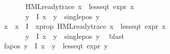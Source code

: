 \begin{isabellebody}
\ \ \ \ \ \ \ {\isacharparenleft}{\kern0pt}HML{\isacharunderscore}{\kern0pt}ready{\isacharunderscore}{\kern0pt}trace\ x\ {\isasymand}\ less{\isacharunderscore}{\kern0pt}eq{\isacharunderscore}{\kern0pt}t\ {\isacharparenleft}{\kern0pt}expr\ x{\isacharparenright}{\kern0pt}\ {\isacharparenleft}{\kern0pt}{\isasyminfinity}{\isacharcomma}{\kern0pt}\ {\isasyminfinity}{\isacharcomma}{\kern0pt}\ {\isasyminfinity}{\isacharcomma}{\kern0pt}\ {}{\isacharcomma}{\kern0pt}\ {}{\isacharcomma}{\kern0pt}\ {}{\isacharparenright}{\kern0pt}{\isacharparenright}{\kern0pt}\ {\isasymand}\isanewline
\ \ \ \ \ \ \ {\isacharparenleft}{\kern0pt}{\isasymforall}y{\isasymin}{\isasymPhi}\ {\isacharbackquote}{\kern0pt}\ I{\isachardot}{\kern0pt}\ x\ {\isasymnoteq}\ y\ {\isasymlongrightarrow}\ single{\isacharunderscore}{\kern0pt}pos\ y{\isacharparenright}{\kern0pt}{\isachardoublequoteclose}\isanewline
\ \ \ \ \isamarkupfalse%
\ \isamarkupfalse%
\ x\ \ {\isachardoublequoteopen}x{\isasymin}{\isasymPhi}\ {\isacharbackquote}{\kern0pt}\ I{\isachardoublequoteclose}\ \ x{\isacharunderscore}{\kern0pt}prop{\isacharcolon}{\kern0pt}\ {\isachardoublequoteopen}{\isacharparenleft}{\kern0pt}HML{\isacharunderscore}{\kern0pt}ready{\isacharunderscore}{\kern0pt}trace\ x\ {\isasymand}\ less{\isacharunderscore}{\kern0pt}eq{\isacharunderscore}{\kern0pt}t\ {\isacharparenleft}{\kern0pt}expr\ x{\isacharparenright}{\kern0pt}\ {\isacharparenleft}{\kern0pt}{\isasyminfinity}{\isacharcomma}{\kern0pt}\ {\isasyminfinity}{\isacharcomma}{\kern0pt}\ {\isasyminfinity}{\isacharcomma}{\kern0pt}\ {}{\isacharcomma}{\kern0pt}\ {}{\isacharcomma}{\kern0pt}\ {}{\isacharparenright}{\kern0pt}{\isacharparenright}{\kern0pt}\ {\isasymand}\isanewline
\ \ \ \ \ \ \ {\isacharparenleft}{\kern0pt}{\isasymforall}y{\isasymin}{\isasymPhi}\ {\isacharbackquote}{\kern0pt}\ I{\isachardot}{\kern0pt}\ x\ {\isasymnoteq}\ y\ {\isasymlongrightarrow}\ single{\isacharunderscore}{\kern0pt}pos\ y{\isacharparenright}{\kern0pt}{\isachardoublequoteclose}\ \isamarkupfalse%
\ blast\isanewline
\ \ \ \ \isamarkupfalse%
\ fa{\isacharunderscore}{\kern0pt}pos{\isacharcolon}{\kern0pt}\ {\isachardoublequoteopen}{\isasymforall}y{\isasymin}{\isasymPhi}\ {\isacharbackquote}{\kern0pt}\ I{\isachardot}{\kern0pt}\ x\ {\isasymnoteq}\ y\ {\isasymlongrightarrow}\ less{\isacharunderscore}{\kern0pt}eq{\isacharunderscore}{\kern0pt}t\ {\isacharparenleft}{\kern0pt}expr\ y{\isacharparenright}{\kern0pt}\ {\isacharparenleft}{\kern0pt}{}{\isacharcomma}{\kern0pt}\ {\isasyminfinity}{\isacharcomma}{\kern0pt}\ {}{\isacharcomma}{\kern0pt}\ {}{\isacharcomma}{\kern0pt}\ {}{\isacharcomma}{\kern0pt}\ {}{\isacharparenright}{\kern0pt}{\isachardoublequoteclose}\isanewline

\end{isabellebody}
